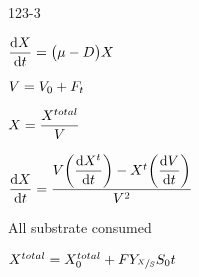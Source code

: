 \begin{mitframe}{123-3}
\begin{listone}
	\item $\dfrac{\mathrm{d}X}{\mathrm{d}\timet}=\big(\chempot-\elecdisplace\big)X$
    \item $\vol=\vol_{\init}+\force_{\timet}$
    \item $X=\dfrac{X^{total}}{\vol}$
    \item $\dfrac{\mathrm{d}X}{\mathrm{d}\timet}=\dfrac{\vol\bigg(\dfrac{\mathrm{d}X^{\timet}}{\mathrm{d}\timet}\bigg)-X^{\timet}\bigg(\dfrac{\mathrm{d}\vol}{\mathrm{d}\timet}\bigg)}{\vol^2}$
    	\begin{listtwo}
        	\item All substrate consumed
            	\begin{listthree}
                	\item $X^{total}=X_{\init}^{total}+\force{Y}_{\sfrac{X}{\entropy}}\entropy_{\init}\timet$
                \end{listthree}
        \end{listtwo}   
\end{listone}   
\end{mitframe}